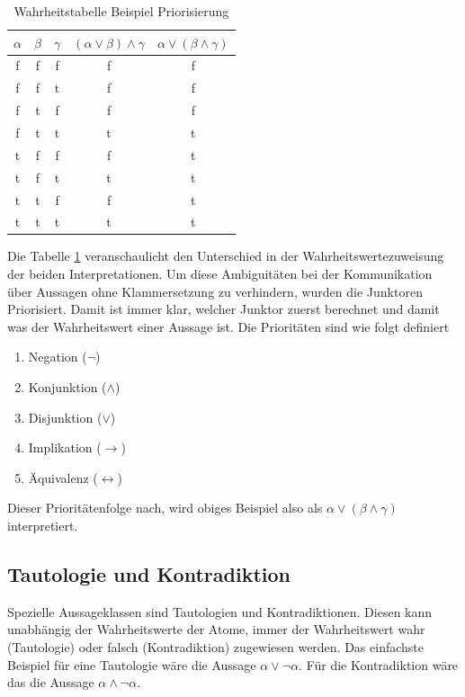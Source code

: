 \begin{table}[h]
\begin{center}
\begin{tabular}{c|c|c|c|c}
$\alpha$ & $\beta$ & $\gamma$ & $(\alpha\vee\beta)\wedge\gamma$ & $\alpha\vee(\beta\wedge\gamma)$ \\
\hline
f & f & f & f & f \\
f & f & t & f & f \\
f & t & f & f & f \\
f & t & t & t & t \\
t & f & f & f & t \\
t & f & t & t & t \\
t & t & f & f & t \\
t & t & t & t & t \\
\end{tabular}
\end{center}
\caption{\label{tbl_prop_prio}Wahrheitstabelle Beispiel Priorisierung}
\end{table}

Die Tabelle \ref{tbl_prop_prio} veranschaulicht den Unterschied in der Wahrheitswertezuweisung der beiden Interpretationen. Um diese Ambiguitäten bei der Kommunikation über Aussagen ohne Klammersetzung zu verhindern, wurden die Junktoren Priorisiert. Damit ist immer klar, welcher Junktor zuerst berechnet und damit was der Wahrheitswert einer Aussage ist. Die Prioritäten sind wie folgt definiert \cite{KB14}
\begin{enumerate}
\item Negation ($\neg$)
\item Konjunktion ($\wedge$)
\item Disjunktion ($\vee$)
\item Implikation ($\rightarrow$)
\item Äquivalenz ($\leftrightarrow$)
\end{enumerate}
Dieser Prioritätenfolge nach, wird obiges Beispiel also als $\alpha\vee(\beta\wedge\gamma)$ interpretiert.

\subsection{Tautologie und Kontradiktion}
Spezielle Aussageklassen sind Tautologien und Kontradiktionen. Diesen kann unabhängig der Wahrheitswerte der Atome, immer der Wahrheitswert wahr (Tautologie) oder falsch (Kontradiktion) zugewiesen werden. Das einfachste Beispiel für eine Tautologie wäre die Aussage $\alpha\vee\neg\alpha$. Für die Kontradiktion wäre das die Aussage $\alpha\wedge\neg\alpha$.

